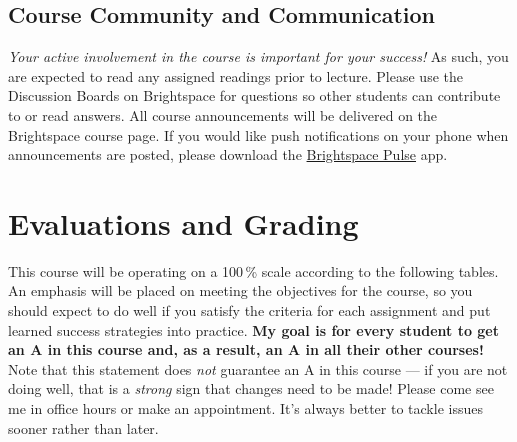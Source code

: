 \documentclass[11pt,letterpaper]{article}
\begin{document}
\subsection{Course Community and Communication}
\emph{Your active involvement in the course is important for your success!} As
such, you are expected to read any assigned readings prior to lecture.
Please use the Discussion Boards on Brightspace for questions so other students
can contribute to or read answers. All course announcements will be delivered on
the Brightspace course page. If you would like push
notifications on your phone when announcements are posted, please download the
\href{https://documentation.brightspace.com/EN/brightspace/requirements/all/pulse.htm}{Brightspace
Pulse} app.


\section{Evaluations and Grading}
This course will be operating on a 100\,\% scale according to the following tables.
An emphasis will be placed on meeting the objectives for the course, so you
should expect to do well if you satisfy the criteria for each assignment and put
learned success strategies into practice. \textbf{My goal is for every student
	to get an A in this course and, as a result, an A in all their other
courses!} Note that this statement does \emph{not} guarantee an A in this course
--- if you are not doing well, that is a \emph{strong} sign that changes need to
be made! Please come see me in office hours or make an appointment. It's always
better to tackle issues sooner rather than later.
\end{document}

